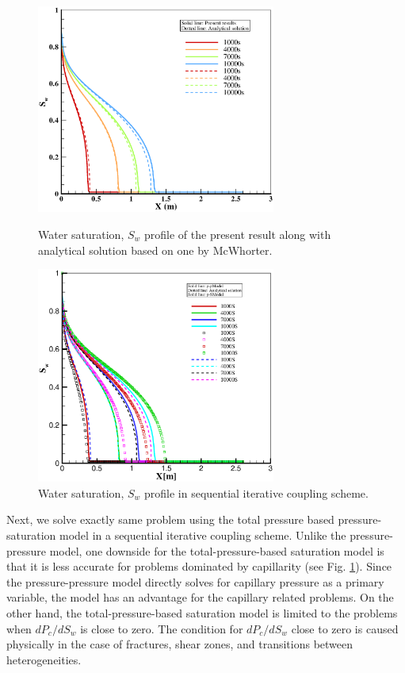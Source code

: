 \begin{figure}[!tbh]
\begin{center}
\includegraphics[width=0.7\textwidth]{chapter_13/figures/fig_13_1_10}
\end{center}
\caption{Water saturation, $S_w$ profile of the present result along with analytical solution based on one by McWhorter.}
\label{mcwt:ppModel}
\begin{center}
\includegraphics[width=0.7\textwidth]{chapter_13/figures/fig_13_1_11}
\end{center}
\caption{Water saturation, $S_w$ profile in sequential iterative coupling scheme.}
\label{mcwt:psModel}
\end{figure}

Next, we solve exactly same problem using the total pressure based pressure-saturation model in a sequential iterative coupling scheme. Unlike the pressure-pressure model, one downside for the total-pressure-based saturation model is that it is less accurate for problems dominated by capillarity (see Fig. \ref{mcwt:psModel}). Since the pressure-pressure model directly solves for capillary pressure as a primary variable, the model has an advantage for the capillary related problems. On the other hand, the total-pressure-based saturation model is limited to the problems when $d P_c/d S_w$ is close to zero. The condition for $d P_c/d S_w$ close to zero is caused physically in the case of fractures, shear zones, and transitions between heterogeneities.

